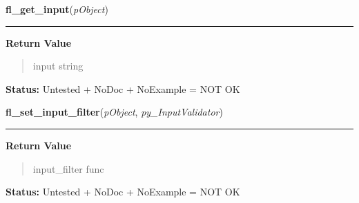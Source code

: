     \label{xformslib:library:fl_get_input}

    \vspace{0.5ex}

\hspace{.8\funcindent}\begin{boxedminipage}{\funcwidth}

    \raggedright \textbf{fl\_get\_input}(\textit{pObject})

    \vspace{-1.5ex}

    \rule{\textwidth}{0.5\fboxrule}
\setlength{\parskip}{2ex}
\setlength{\parskip}{1ex}
      \textbf{Return Value}
    \vspace{-1ex}

      \begin{quote}
      input string

      \end{quote}

\textbf{Status:} Untested + NoDoc + NoExample = NOT OK



    \end{boxedminipage}

    \label{xformslib:library:fl_set_input_filter}

    \vspace{0.5ex}

\hspace{.8\funcindent}\begin{boxedminipage}{\funcwidth}

    \raggedright \textbf{fl\_set\_input\_filter}(\textit{pObject}, \textit{py\_InputValidator})

    \vspace{-1.5ex}

    \rule{\textwidth}{0.5\fboxrule}
\setlength{\parskip}{2ex}
\setlength{\parskip}{1ex}
      \textbf{Return Value}
    \vspace{-1ex}

      \begin{quote}
      input\_filter func

      \end{quote}

\textbf{Status:} Untested + NoDoc + NoExample = NOT OK



    \end{boxedminipage}

